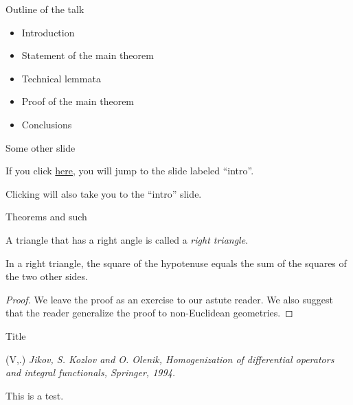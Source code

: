 \documentclass{beamer}
\newenvironment{reference}[2]{%
  \begin{textblock*}{\textwidth}(#1,#2) 
      \footnotesize\it\bgroup\color{red!50!black}}{\egroup\end{textblock*}}
\begin{document}
\begin{frame}[label=intro]{Outline of the talk} 
 
\begin{itemize} 
  \item Introduction 
  \pause 
  \item Statement of the main theorem 
  \pause 
  \item Technical lemmata 
  \pause 
  \item Proof of the main theorem 
  \pause 
  \item Conclusions 
\end{itemize} 
 
\end{frame} 

\begin{frame}{Some other slide}

If you click \hyperlink{intro}{here}, you will jump to the slide
labeled ``intro''.

\bigskip

Clicking \hyperlink{intro}{} will also
take you to the ``intro'' slide.

\end{frame}

\begin{frame}{Theorems and such}

\begin{definition}
  A triangle that has a right angle is called
  a \emph{right triangle}.
\end{definition}

\begin{theorem}
  In a right triangle, the square of the hypotenuse
  equals the sum of the squares of the two other sides.
\end{theorem}

\begin{proof}
  We leave the proof as an exercise to our astute reader.
  We also suggest that the reader generalize the proof to
  non-Euclidean geometries.
\end{proof}

\end{frame}

\begin{frame}{Title}
   \begin{reference}{4mm}{85mm}
       V. Jikov, S. Kozlov and O. Olenik, Homogenization
       of differential operators and integral
       functionals, Springer, 1994.
   \end{reference} 
  
   This is a test.
\end{frame}
\end{document}
